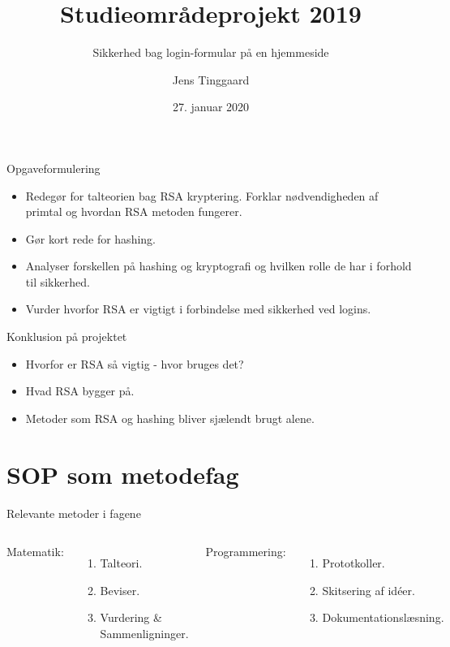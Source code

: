 \documentclass[10pt, aspectratio=169, usepdftitle=false]{beamer}
\title{Studieområdeprojekt 2019}
\subtitle{Sikkerhed bag login-formular på en hjemmeside}
\date{27. januar 2020}
\author{Jens Tinggaard}
\institute{Odense Tekniske Gymnasium}
\begin{document}
\maketitle


\begin{frame}{Opgaveformulering}
\begin{itemize}
    \large
    \item Redegør for talteorien bag RSA kryptering. Forklar nødvendigheden af primtal og hvordan RSA metoden fungerer.
    \item Gør kort rede for hashing.
    \item Analyser forskellen på hashing og kryptografi og hvilken rolle de har i forhold til sikkerhed.
    \item Vurder hvorfor RSA er vigtigt i forbindelse med sikkerhed ved logins.
\end{itemize}
\end{frame}

\begin{frame}{Konklusion på projektet}
    \begin{itemize}
        \large
        \item Hvorfor er RSA så vigtig - hvor bruges det?
        \item Hvad RSA bygger på.
        \item Metoder som RSA og hashing bliver sjælendt brugt alene.
    \end{itemize}
\end{frame}

\section{SOP som metodefag}

\begin{frame}{Relevante metoder i fagene}
    \begin{columns}[T,onlytextwidth]
            \alert{Matematik:}
            \begin{enumerate}
                \item Talteori.
                \item Beviser. %
                \item Vurdering \& Sammenligninger.
            \end{enumerate}
            \alert{Programmering:}
            \begin{enumerate}
                \item Prototkoller.
                \item Skitsering af id\'eer.
                \item Dokumentationslæsning.
            \end{enumerate}
    \end{columns}
\end{frame}
\end{document}
